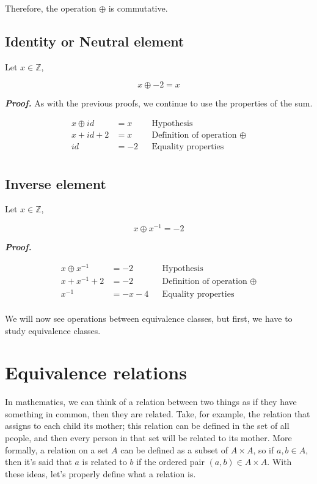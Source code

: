 \documentclass{report}
\begin{document}
    Therefore, the operation $\oplus$ is commutative.

    \subsection*{Identity or Neutral element}

    Let $x \in \mathbb{Z}$,

    $$x\oplus -2 = x $$

    \textit{\textbf{Proof.}} As with the previous proofs, we continue to use the properties of the sum.

    \begin{align*}
        x\oplus id &= x &&\text{Hypothesis}\\
        x + id + 2&= x &&\text{Definition of operation } \oplus\\
        id &= -2  &&\text{Equality properties}\\
    \end{align*}

    \subsection*{Inverse element}

    Let $x \in \mathbb{Z}$,

    $$x\oplus x^{-1} = -2 $$

    \textit{\textbf{Proof.}}

    \begin{align*}
        x\oplus x^{-1} &= -2 &&\text{Hypothesis}\\
        x + x^{-1} + 2&= -2 &&\text{Definition of operation } \oplus\\
        x^{-1} &= -x -4  &&\text{Equality properties}\\
    \end{align*}

    We will now see operations between equivalence classes, but first, we have to study equivalence classes.

    \section{Equivalence relations}

    In mathematics, we can think of a relation between two things as if they have something in common, then they are related. Take, for example, the relation that assigns to each child its mother; this relation can be defined in the set of all people, and then every person in that set will be related to its mother. More formally, a relation on a set $A$ can be defined as a subset of $A \times A$, so if $a, b \in A$, then it's said that $a$ is related to $b$ if the ordered pair $(a,b) \in A\times A$. With these ideas, let's properly define what a relation is.\\
\end{document}
